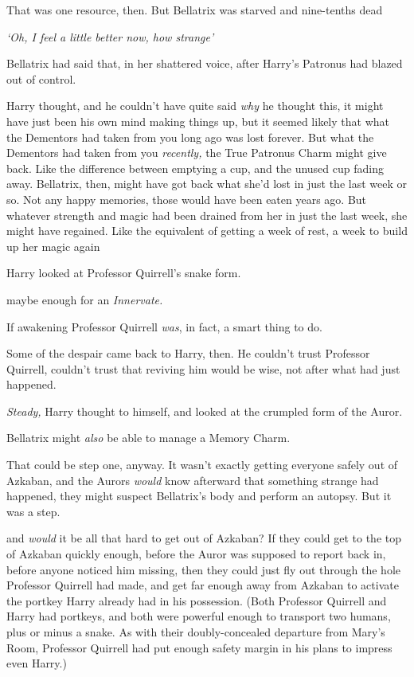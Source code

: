 That was one resource, then. But Bellatrix was starved and nine-tenths
dead{\el}

\emph{`Oh, I feel a little better now, how strange{\el}'}

Bellatrix had said that, in her shattered voice, after Harry's Patronus had
blazed out of control.

Harry thought, and he couldn't have quite said \emph{why} he thought this, it
might have just been his own mind making things up, but{\el} it seemed
likely that what the Dementors had taken from you long ago was lost forever.
But what the Dementors had taken from you \emph{recently,} the True Patronus
Charm might give back. Like the difference between emptying a cup, and the
unused cup fading away. Bellatrix, then, might have got back what she'd lost in
just the last week or so. Not any happy memories, those would have been eaten
years ago. But whatever strength and magic had been drained from her in just
the last week, she might have regained. Like the equivalent of getting a week
of rest, a week to build up her magic again{\el}

Harry looked at Professor Quirrell's snake form.

{\el} maybe enough for an \emph{Innervate.}

If awakening Professor Quirrell \emph{was}, in fact, a smart thing to do.

Some of the despair came back to Harry, then. He couldn't trust Professor
Quirrell, couldn't trust that reviving him would be wise, not after what had
just happened.

\emph{Steady,} Harry thought to himself, and looked at the crumpled form of the
Auror.

Bellatrix might \emph{also} be able to manage a Memory Charm.

That could be step one, anyway. It wasn't exactly getting everyone safely out
of Azkaban, and the Aurors \emph{would} know afterward that something strange
had happened, they might suspect Bellatrix's body and perform an autopsy. But
it was a step.

{\el} and \emph{would} it be all that hard to get out of Azkaban? If they
could get to the top of Azkaban quickly enough, before the Auror was supposed
to report back in, before anyone noticed him missing, then they could just fly
out through the hole Professor Quirrell had made, and get far enough away from
Azkaban to activate the portkey Harry already had in his possession. (Both
Professor Quirrell and Harry had portkeys, and both were powerful enough to
transport two humans, plus or minus a snake. As with their doubly-concealed
departure from Mary's Room, Professor Quirrell had put enough safety margin in
his plans to impress even Harry.)


